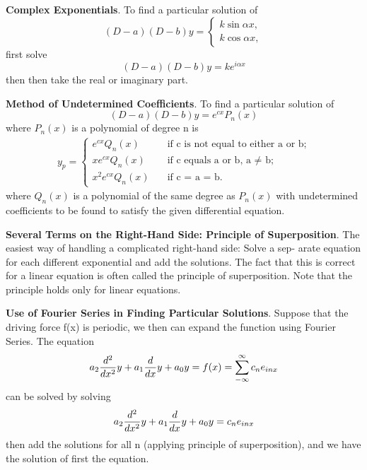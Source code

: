 \documentclass[../main.tex]{subfiles}
\begin{document}
\textbf{Complex Exponentials}. To find a particular solution of
\begin{equation*}
    (D - a)(D - b)y=\begin{cases}
        k\sin \alpha x,\\
        k\cos \alpha x,
    \end{cases}
\end{equation*}
first solve
\begin{equation*}
    (D - a)(D - b)y=ke^{i\alpha x}
\end{equation*}
then then take the real or imaginary part. 

\textbf{Method of Undetermined Coefficients}. To find a particular solution of
\begin{equation*}
    (D - a)(D - b)y=e^{cx}P_n(x)
\end{equation*}
where $P_n(x)$ is a polynomial of degree n is
\begin{align*}
    y_p=
    \begin{cases}
        e^{cx}Q_n(x) \quad&\text{if c is not equal to either a or b;}\\
        xe^{cx}Q_n(x) \quad&\text{if c equals a or b, a  $\neq$ b;}\\
        x^2e^{cx}Q_n(x) \quad&\text{if c = a = b.}
    \end{cases}
\end{align*}
where $Q_n(x)$ is a polynomial of the same degree as $P_n(x)$ with undetermined
coefficients to be found to satisfy the given differential equation.

\textbf{Several Terms on the Right-Hand Side: Principle of Superposition}.
The easiest way of handling a complicated right-hand side: Solve a sep-
arate equation for each different exponential and add the solutions. The fact that
this is correct for a linear equation is often called the principle of superposition.
Note that the principle holds only for linear equations.

\textbf{Use of Fourier Series in Finding Particular Solutions}.
Suppose that the driving force f(x) is periodic, we then can expand the function using Fourier Series.
The equation
\begin{equation*}
    a_2\frac{d^2}{dx^2} y+a_1\frac{d}{dx} y+a_0y=f(x)=\sum_{-\infty}^{\infty}c_ne_{inx}
\end{equation*}
can be solved by solving
\begin{equation*}
    a_2\frac{d^2}{dx^2} y+a_1\frac{d}{dx} y+a_0y=c_ne_{inx}
\end{equation*}
then add the solutions for all n (applying principle of superposition), and we have the solution of first the equation.
\end{document}
